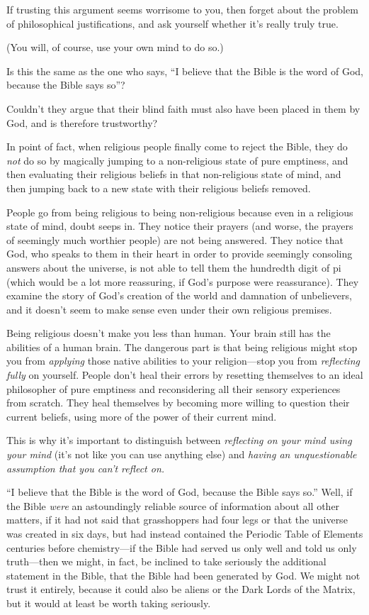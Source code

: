 {
 If trusting this argument seems worrisome to you, then forget
about the problem of philosophical justifications, and ask yourself
whether it's really truly true.}

{
 (You will, of course, use your own mind to do so.)}

{
 Is this the same as the one who says, ``I believe
that the Bible is the word of God, because the Bible says
so''?}

{
 Couldn't they argue that their blind faith must
also have been placed in them by God, and is therefore trustworthy?}

{
 In point of fact, when religious people finally come to reject the
Bible, they do \textit{not} do so by magically jumping to a
non-religious state of pure emptiness, and then evaluating their
religious beliefs in that non-religious state of mind, and then jumping
back to a new state with their religious beliefs removed.}

{
 People go from being religious to being non-religious because even
in a religious state of mind, doubt seeps in. They notice their prayers
(and worse, the prayers of seemingly much worthier people) are not
being answered. They notice that God, who speaks to them in their heart
in order to provide seemingly consoling answers about the universe, is
not able to tell them the hundredth digit of pi (which would be a lot
more reassuring, if God's purpose were reassurance).
They examine the story of God's creation of the world
and damnation of unbelievers, and it doesn't seem to
make sense even under their own religious premises.}

{
 Being religious doesn't make you less than human.
Your brain still has the abilities of a human brain. The dangerous part
is that being religious might stop you from \textit{applying} those
native abilities to your religion---stop you from \textit{reflecting
fully} on yourself. People don't heal their errors by
resetting themselves to an ideal philosopher of pure emptiness and
reconsidering all their sensory experiences from scratch. They heal
themselves by becoming more willing to question their current beliefs,
using more of the power of their current mind.}

{
 This is why it's important to distinguish between
\textit{reflecting on your mind using your mind} (it's
not like you can use anything else) and \textit{having an
unquestionable assumption that you can't reflect on.}}

{
 ``I believe that the Bible is the word of God,
because the Bible says so.'' Well, if the Bible
\textit{were} an astoundingly reliable source of information about all
other matters, if it had not said that grasshoppers had four legs or
that the universe was created in six days, but had instead contained
the Periodic Table of Elements centuries before chemistry---if the
Bible had served us only well and told us only truth---then we might,
in fact, be inclined to take seriously the additional statement in the
Bible, that the Bible had been generated by God. We might not trust it
entirely, because it could also be aliens or the Dark Lords of the
Matrix, but it would at least be worth taking seriously.}


